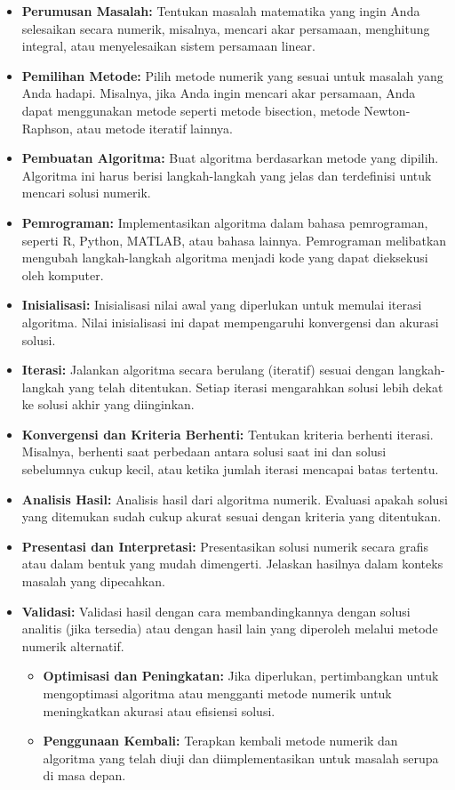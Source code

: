 \documentclass[
]{book}
\providecommand{\tightlist}{%
  \setlength{\itemsep}{0pt}\setlength{\parskip}{0pt}}
\theoremstyle{definition}
\theoremstyle{definition}
\theoremstyle{definition}
\theoremstyle{definition}
\theoremstyle{remark}
\begin{document}
\begin{itemize}
\tightlist
\item
  \textbf{Perumusan Masalah:} Tentukan masalah matematika yang ingin Anda selesaikan secara numerik, misalnya, mencari akar persamaan, menghitung integral, atau menyelesaikan sistem persamaan linear.
\item
  \textbf{Pemilihan Metode:} Pilih metode numerik yang sesuai untuk masalah yang Anda hadapi. Misalnya, jika Anda ingin mencari akar persamaan, Anda dapat menggunakan metode seperti metode bisection, metode Newton-Raphson, atau metode iteratif lainnya.
\item
  \textbf{Pembuatan Algoritma:} Buat algoritma berdasarkan metode yang dipilih. Algoritma ini harus berisi langkah-langkah yang jelas dan terdefinisi untuk mencari solusi numerik.
\item
  \textbf{Pemrograman:} Implementasikan algoritma dalam bahasa pemrograman, seperti R, Python, MATLAB, atau bahasa lainnya. Pemrograman melibatkan mengubah langkah-langkah algoritma menjadi kode yang dapat dieksekusi oleh komputer.
\item
  \textbf{Inisialisasi:} Inisialisasi nilai awal yang diperlukan untuk memulai iterasi algoritma. Nilai inisialisasi ini dapat mempengaruhi konvergensi dan akurasi solusi.
\item
  \textbf{Iterasi:} Jalankan algoritma secara berulang (iteratif) sesuai dengan langkah-langkah yang telah ditentukan. Setiap iterasi mengarahkan solusi lebih dekat ke solusi akhir yang diinginkan.
\item
  \textbf{Konvergensi dan Kriteria Berhenti:} Tentukan kriteria berhenti iterasi. Misalnya, berhenti saat perbedaan antara solusi saat ini dan solusi sebelumnya cukup kecil, atau ketika jumlah iterasi mencapai batas tertentu.
\item
  \textbf{Analisis Hasil:} Analisis hasil dari algoritma numerik. Evaluasi apakah solusi yang ditemukan sudah cukup akurat sesuai dengan kriteria yang ditentukan.
\item
  \textbf{Presentasi dan Interpretasi:} Presentasikan solusi numerik secara grafis atau dalam bentuk yang mudah dimengerti. Jelaskan hasilnya dalam konteks masalah yang dipecahkan.
\item
  \textbf{Validasi:} Validasi hasil dengan cara membandingkannya dengan solusi analitis (jika tersedia) atau dengan hasil lain yang diperoleh melalui metode numerik alternatif.

  \begin{itemize}
  \tightlist
  \item
    \textbf{Optimisasi dan Peningkatan:} Jika diperlukan, pertimbangkan untuk mengoptimasi algoritma atau mengganti metode numerik untuk meningkatkan akurasi atau efisiensi solusi.
  \item
    \textbf{Penggunaan Kembali:} Terapkan kembali metode numerik dan algoritma yang telah diuji dan diimplementasikan untuk masalah serupa di masa depan.
  \end{itemize}
\end{itemize}
\end{document}
